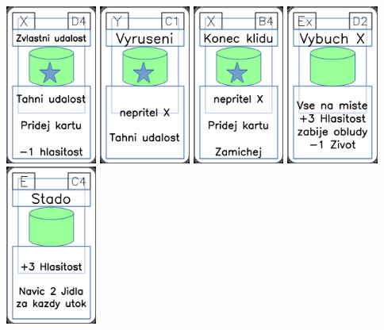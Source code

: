\documentclass[a4paper]{article}
\begin{document}
	\includegraphics[width=3.0cm]{img-5_18}
	\includegraphics[width=3.0cm]{img-5_40}
	\includegraphics[width=3.0cm]{img-5_8}
	\includegraphics[width=3.0cm]{img-4_16}
	\includegraphics[width=3.0cm]{img-4_43}
\end{document}
